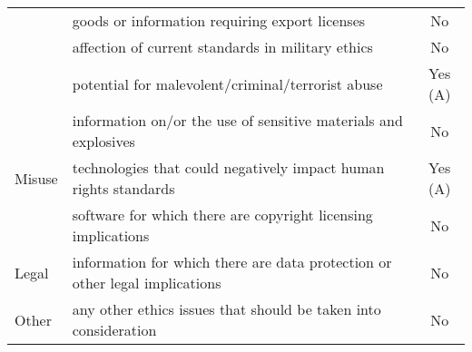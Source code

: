 \begin{table}[hpt]
\begin{adjustbox}{center}
\begin{tabular}{|l||l|c|}
  \cellcolor[HTML]{ECF4FF}                                                                                 & goods or information requiring export licenses                                             & No                                                   \\ \cline{2-3} 
  \rowcolor[HTML]{ECF4FF} 
  \multirow{-4}{*}{\cellcolor[HTML]{ECF4FF}Dual use}                                                       & affection of current standards in military ethics                                          & No                                                   \\ \hline
                                                                                                           & {\color[HTML]{FF0000}potential for malevolent/criminal/terrorist abuse}                    & {\color[HTML]{FF0000}Yes (A)}                        \\ \cline{2-3} 
                                                                                                           & \cellcolor[HTML]{ECF4FF}information on/or the use of sensitive materials and explosives    & \cellcolor[HTML]{ECF4FF}No                           \\ \cline{2-3} 
  \multirow{-3}{*}{Misuse}                                                                                 & {\color[HTML]{FF0000}technologies that could negatively impact human rights standards}     & {\color[HTML]{FF0000}Yes (A)}                         \\ \hline
  \rowcolor[HTML]{ECF4FF} 
  \cellcolor[HTML]{ECF4FF}                                                                                 & software for which there are copyright licensing implications                              & No                                                   \\ \cline{2-3} 
  \multirow{-2}{*}{\cellcolor[HTML]{ECF4FF}Legal}                                                          & information for which there are data protection or other legal implications                & No                                                   \\ \hline
  Other                                                                                                    & \cellcolor[HTML]{ECF4FF}any other ethics issues that should be taken into consideration    & \cellcolor[HTML]{ECF4FF}No                           \\ \hline
  \end{tabular}
  \end{adjustbox}
\end{table}